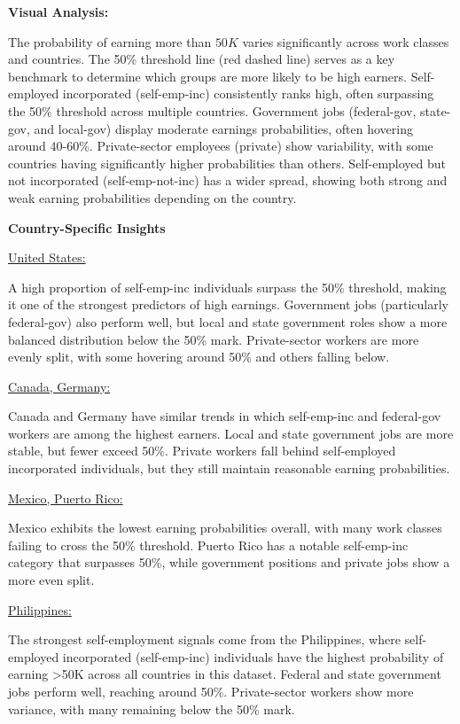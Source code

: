 \documentclass[journal,onecolumn]{IEEEtran}
\begin{document}
\textbf{Visual Analysis:} 

\medskip

The probability of earning more than $50K$ varies significantly across work classes and countries. The 50\% threshold line (red dashed line) serves as a key benchmark to determine which groups are more likely to be high earners.
Self-employed incorporated (self-emp-inc) consistently ranks high, often surpassing the 50\% threshold across multiple countries.
Government jobs (federal-gov, state-gov, and local-gov) display moderate earnings probabilities, often hovering around 40-60\%.
Private-sector employees (private) show variability, with some countries having significantly higher probabilities than others.
Self-employed but not incorporated (self-emp-not-inc) has a wider spread, showing both strong and weak earning probabilities depending on the country.

\medskip

\textbf{Country-Specific Insights}

\medskip

\underline{United States:}
\par A high proportion of self-emp-inc individuals surpass the 50\% threshold, making it one of the strongest predictors of high earnings.
Government jobs (particularly federal-gov) also perform well, but local and state government roles show a more balanced distribution below the 50\% mark.
Private-sector workers are more evenly split, with some hovering around 50\% and others falling below.

\underline{Canada, Germany:}
\par Canada and Germany have similar trends in which self-emp-inc and federal-gov workers are among the highest earners.
Local and state government jobs are more stable, but fewer exceed 50\%.
Private workers fall behind self-employed incorporated individuals, but they still maintain reasonable earning probabilities.

\underline{Mexico, Puerto Rico:}
\par Mexico exhibits the lowest earning probabilities overall, with many work classes failing to cross the 50\% threshold.
Puerto Rico has a notable self-emp-inc category that surpasses 50\%, while government positions and private jobs show a more even split.

\underline{Philippines:}
\par The strongest self-employment signals come from the Philippines, where self-employed incorporated (self-emp-inc) individuals have the highest probability of earning >50K across all countries in this dataset.
Federal and state government jobs perform well, reaching around 50\%.
Private-sector workers show more variance, with many remaining below the 50\% mark.
\end{document}
